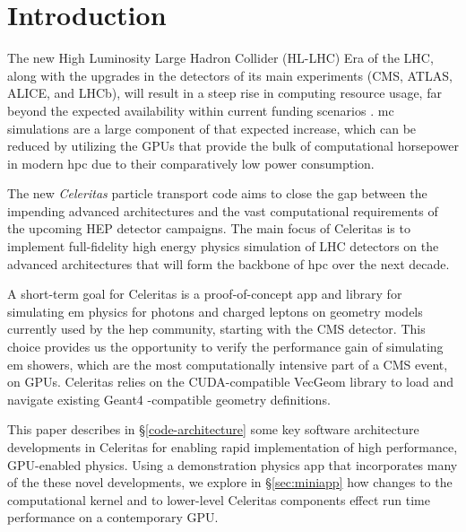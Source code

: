 \documentclass{webofc}
\begin{document}
\section{Introduction}
\label{sec:introduction}

The new High Luminosity Large Hadron Collider (HL-LHC) Era of the LHC, along
with the upgrades in the detectors of its main experiments (CMS, ATLAS, ALICE,
and LHCb), will result in a steep rise in computing resource usage, far beyond
the expected availability within current funding scenarios
\cite{the_hep_software_foundation_roadmap_2019}. \ac{mc} simulations are a
large component of that expected increase, which can be reduced by utilizing
the GPUs that provide the bulk of computational horsepower in modern \ac{hpc}
due to their comparatively low power consumption.

The new \emph{Celeritas} particle transport code aims to close the gap between
the impending advanced architectures and the vast computational
requirements of the upcoming HEP detector campaigns. The main focus of
Celeritas is to implement full-fidelity high energy physics simulation of
LHC detectors on the advanced architectures that will form the backbone of
\ac{hpc} over the next decade.

A short-term goal for Celeritas is a proof-of-concept app and library for
simulating \ac{em} physics for photons and charged leptons on
geometry models currently used by the \ac{hep} community, starting with the CMS
detector.
This choice provides us the opportunity to verify the
performance gain of simulating \ac{em} showers, which are the most
computationally intensive part of a CMS event, on GPUs. Celeritas relies on the
CUDA-compatible VecGeom \cite{VecGeom:web} library to load and navigate existing
Geant4 \cite{geant4}-compatible geometry definitions.

This paper describes in \S\ref{code-architecture} some key software architecture
developments in Celeritas for enabling rapid implementation of high
performance, GPU-enabled physics. Using a demonstration physics app that
incorporates many of the these novel developments, we explore in
\S\ref{sec:miniapp} how changes to the computational kernel and to lower-level
Celeritas components effect run time performance on a contemporary GPU.


\end{document}

